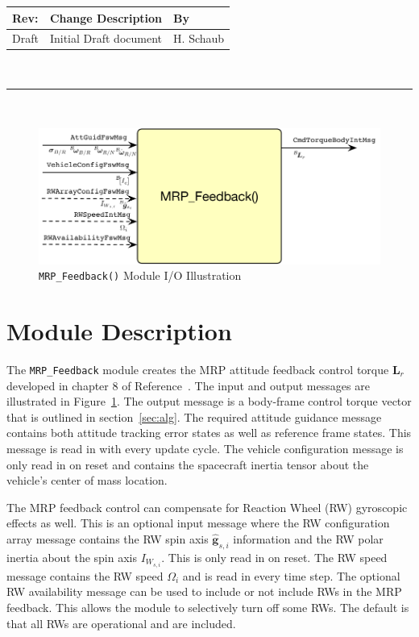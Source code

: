 \documentclass[]{BasiliskReportMemo}
\begin{document}
\makeCover


%
%
\pagestyle{empty}
{\renewcommand{\arraystretch}{2}
\noindent
\begin{longtable}{|p{0.5in}|p{4.5in}|p{1.14in}|}
\hline
{\bfseries Rev}: & {\bfseries Change Description} & {\bfseries By} \\
\hline
Draft & Initial Draft document & H. Schaub \\
\hline

\end{longtable}
}

\newpage
\setcounter{page}{1}
\pagestyle{fancy}

\tableofcontents
~\\ \hrule ~\\

\begin{figure}[htb]
	\centerline{
	\includegraphics[]{Figures/moduleIO}
	}
	\caption{{\tt MRP\_Feedback()} Module I/O Illustration}
	\label{fig:moduleIO}
\end{figure}
\section{Module Description}
The {\tt MRP\_Feedback} module creates the MRP attitude feedback control torque $\bm L_{r}$ developed in chapter 8 of Reference~.  The input and output messages are illustrated in Figure~\ref{fig:moduleIO}.  The output message is a body-frame control torque vector that is outlined in section~\ref{sec:alg}.  The required attitude guidance message contains both attitude tracking error states as well as reference frame states.  This message is read in with every update cycle. The vehicle configuration message is only read in on reset and contains the spacecraft inertia tensor about the vehicle's center of mass location.  

The MRP feedback control can compensate for Reaction Wheel (RW) gyroscopic effects as well.  This is an optional input message where the RW configuration array message contains the RW spin axis $\hat{\bm g}_{s,i}$ information and the RW polar inertia about the spin axis $I_{W_{s,i}}$.  This is only read in on reset.  The RW speed message contains the RW speed $\Omega_{i}$ and is read in every time step.  The optional RW availability message can be used to include or not include RWs in the MRP feedback.  This allows the module to selectively turn off some RWs.  The default is that all RWs are operational and are included.  
\end{document}
